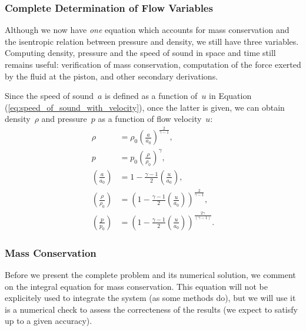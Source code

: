 \documentclass[../../thesis.tex]{subfiles}
\begin{document}
\subsubsection{Complete Determination of Flow Variables}
Although we now have \textit{one} equation which accounts for mass conservation and the isentropic relation between pressure and density, we still have three variables. 
Computing density, pressure and the speed of sound in space and time still remains useful: 
verification of mass conservation, computation of the force exerted by the fluid at the piston, and other secondary derivations.

Since the speed of sound~$a$ is defined as a function of~$u$ in Equation (\ref{eq:speed_of_sound_with_velocity}),
once the latter is given, we can obtain density~$\rho$ and pressure~$p$ as a function of flow velocity~$u$:
\begin{subequations}
    \begin{align}
        \rho &= \rho_0 \left(\frac{a}{a_0}\right)^{\frac{2}{\gamma-1}},
        \\
        p    &= p_0 \left(\frac{\rho}{\rho_0}\right)^{\gamma},
        \\[2mm]
        \left(\frac{a}{a_0}\right) &= 1 - \frac{\gamma-1}{2}\left(\frac{u}{a_0}\right), 
        \\[2mm]
        \left(\frac{\rho}{\rho_0}\right) &= \left(1 - \frac{\gamma-1}{2}\left(\frac{u}{a_0}\right)\right)^{\frac{2}{\gamma-1}},
        \label{eq:density_as_a_function_of_speed}
        \\[2mm]
        \left(\frac{p}{p_0}\right) &= \left(1 - \frac{\gamma-1}{2}\left(\frac{u}{a_0}\right)\right)^{\frac{2\gamma}{\left(\gamma-1\right)}}.
    \end{align}
\end{subequations}

\subsubsection{Mass Conservation}
\label{sec:mass_conservation_definition}
Before we present the complete problem and its numerical solution, we comment 
on the integral equation for mass conservation.
This equation will not be explicitely used to integrate the system
(as some methods do), 
but we will use it is a numerical check 
to assess the correcteness of the results
(we expect to satisfy up to a given accuracy).
\end{document}
